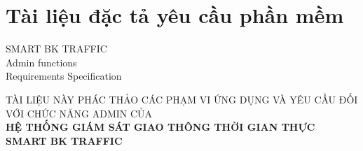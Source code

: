 \chapter*{Tài liệu đặc tả yêu cầu phần mềm}
\label{ch:srs}

\begin{Huge}
	\pagebreak
	
	\bigskip 
	\bigskip
	\bigskip 
	\bigskip
	\begin{center}
		SMART BK TRAFFIC\\
		Admin functions\\
		Requirements Specification
	\end{center}
\end{Huge}
\bigskip \bigskip
\begin{large}
	\begin{center}
		\MakeUppercase{Tài liệu này phác thảo các phạm vi ứng dụng và yêu cầu đối với chức năng admin của}\\
		
		\textbf{
			\MakeUppercase{hệ thống giám sát giao thông thời gian thực}\\
			\MakeUppercase{Smart BK traffic}
		}
		
	\end{center}
\end{large}